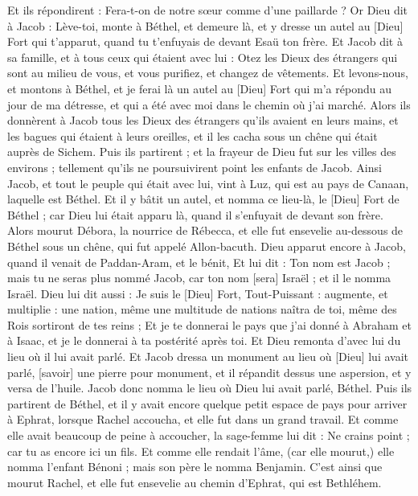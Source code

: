 \begin{multicols}{2}
Et ils répondirent : Fera-t-on de notre sœur comme d'une paillarde ?
\VerseOne{}Or Dieu dit à Jacob : Lève-toi, monte à Béthel, et demeure là, et y dresse un autel au [Dieu] Fort qui t'apparut, quand tu t'enfuyais de devant Esaü ton frère.
Et Jacob dit à sa famille, et à tous ceux qui étaient avec lui : Otez les Dieux des étrangers qui sont au milieu de vous, et vous purifiez, et changez de vêtements.
Et levons-nous, et montons à Béthel, et je ferai là un autel au [Dieu] Fort qui m'a répondu au jour de ma détresse, et qui a été avec moi dans le chemin où j'ai marché.
Alors ils donnèrent à Jacob tous les Dieux des étrangers qu'ils avaient en leurs mains, et les bagues qui étaient à leurs oreilles, et il les cacha sous un chêne qui était auprès de Sichem.
Puis ils partirent ; et la frayeur de Dieu fut sur les villes des environs ; tellement qu'ils ne poursuivirent point les enfants de Jacob.
Ainsi Jacob, et tout le peuple qui était avec lui, vint à Luz, qui est au pays de Canaan, laquelle est Béthel.
Et il y bâtit un autel, et nomma ce lieu-là, le [Dieu] Fort de Béthel ; car Dieu lui était apparu là, quand il s'enfuyait de devant son frère.
Alors mourut Débora, la nourrice de Rébecca, et elle fut ensevelie au-dessous de Béthel sous un chêne, qui fut appelé Allon-bacuth.
Dieu apparut encore à Jacob, quand il venait de Paddan-Aram, et le bénit,
Et lui dit : Ton nom est Jacob ; mais tu ne seras plus nommé Jacob, car ton nom [sera] Israël ; et il le nomma Israël.
Dieu lui dit aussi : Je suis le [Dieu] Fort, Tout-Puissant : augmente, et multiplie : une nation, même une multitude de nations naîtra de toi, même des Rois sortiront de tes reins ;
Et je te donnerai le pays que j'ai donné à Abraham et à Isaac, et je le donnerai à ta postérité après toi.
Et Dieu remonta d'avec lui du lieu où il lui avait parlé.
Et Jacob dressa un monument au lieu où [Dieu] lui avait parlé, [savoir] une pierre pour monument, et il répandit dessus une aspersion, et y versa de l'huile.
Jacob donc nomma le lieu où Dieu lui avait parlé, Béthel.
Puis ils partirent de Béthel, et il y avait encore quelque petit espace de pays pour arriver à Ephrat, lorsque Rachel accoucha, et elle fut dans un grand travail.
Et comme elle avait beaucoup de peine à accoucher, la sage-femme lui dit : Ne crains point ; car tu as encore ici un fils.
Et comme elle rendait l'âme, (car elle mourut,) elle nomma l'enfant Bénoni ; mais son père le nomma Benjamin.
C'est ainsi que mourut Rachel, et elle fut ensevelie au chemin d'Ephrat, qui est Bethléhem.

\end{multicols}
